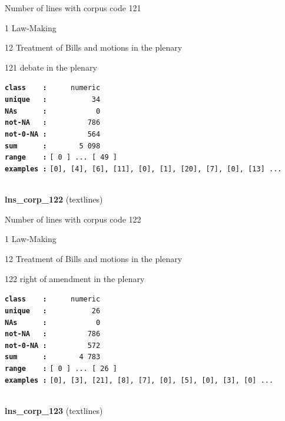 \documentclass[]{article}
\begin{document}
Number of lines with corpus code 121

1 Law-Making

12 Treatment of Bills and motions in the plenary

121 debate in the plenary

\textbf{\texttt{class\ \ \ \ :}} \texttt{~~~~~numeric}\\
\textbf{\texttt{unique\ \ \ :}} \texttt{~~~~~~~~~~34}\\
\textbf{\texttt{NAs\ \ \ \ \ \ :}} \texttt{~~~~~~~~~~~0}\\
\textbf{\texttt{not-NA\ \ \ :}} \texttt{~~~~~~~~~786}\\
\textbf{\texttt{not-0-NA\ :}} \texttt{~~~~~~~~~564}\\
\textbf{\texttt{sum\ \ \ \ \ \ :}} \texttt{~~~~~~~5~098}\\
\textbf{\texttt{range\ \ \ \ :}}
\texttt{{[}\ 0\ {]}\ ...\ {[}\ 49\ {]}}\\
\textbf{\texttt{examples\ :}}
\texttt{{[}0{]},\ {[}4{]},\ {[}6{]},\ {[}11{]},\ {[}0{]},\ {[}1{]},\ {[}20{]},\ {[}7{]},\ {[}0{]},\ {[}13{]}\ ...}\\

~

\textbf{lns\_corp\_122} (textlines)

Number of lines with corpus code 122

1 Law-Making

12 Treatment of Bills and motions in the plenary

122 right of amendment in the plenary

\textbf{\texttt{class\ \ \ \ :}} \texttt{~~~~~numeric}\\
\textbf{\texttt{unique\ \ \ :}} \texttt{~~~~~~~~~~26}\\
\textbf{\texttt{NAs\ \ \ \ \ \ :}} \texttt{~~~~~~~~~~~0}\\
\textbf{\texttt{not-NA\ \ \ :}} \texttt{~~~~~~~~~786}\\
\textbf{\texttt{not-0-NA\ :}} \texttt{~~~~~~~~~572}\\
\textbf{\texttt{sum\ \ \ \ \ \ :}} \texttt{~~~~~~~4~783}\\
\textbf{\texttt{range\ \ \ \ :}}
\texttt{{[}\ 0\ {]}\ ...\ {[}\ 26\ {]}}\\
\textbf{\texttt{examples\ :}}
\texttt{{[}0{]},\ {[}3{]},\ {[}21{]},\ {[}8{]},\ {[}7{]},\ {[}0{]},\ {[}5{]},\ {[}0{]},\ {[}3{]},\ {[}0{]}\ ...}\\

~

\textbf{lns\_corp\_123} (textlines)
\end{document}
